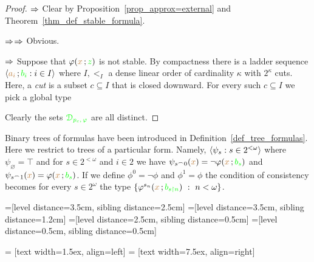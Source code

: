 \begin{proof}
 $\Rightarrow$ Clear by Proposition~\ref{prop_approx=external} and Theorem~\ref{thm_def_stable_formula}.
 
 $\Rightarrow$$\Rightarrow$ Obvious.
 
 $\Rightarrow$ Suppose that $\varphi({\color{brown} x}\,;{\color{green} z})$ is not stable.
 By compactness there is a ladder sequence  $\langle{\color{brown}a_i}\,;{\color{green} b_i} : i\in I\rangle$ where $I,<_I$ a dense linear order of cardinality $\kappa$ with $2^\kappa$ cuts.
 Here, a \textit{cut\/} is a subset $c\subseteq I$ that is closed downward.
 For every such $c\subseteq I$ we pick a global type
 
 \vspace*{-2ex}
 
 Clearly the sets ${\color{green}\EuScript D_{p_c,\,\varphi} }$ are all distinct.
\end{proof}

Binary trees of formulas have been introduced in Definition~\ref{def_tree_formulas}.
Here we restrict to trees of a particular form.
Namely, $\langle\psi_s:s\in 2^{<\omega}\rangle$  where $\psi_\varnothing=\top$ and for $s\in 2^{<\omega}$ and $i\in 2$ we have $\psi_{s^\frown 0}({\color{brown} x})=\neg\varphi({\color{brown} x}\,;{\color{green} b_s})$ and $\psi_{s^\frown 1}({\color{brown} x})=\varphi({\color{brown} x}\,;{\color{green} b_s})$.
If we define $\phi^0=\neg\phi$ and $\phi^1=\phi$ the condition of consistency becomes for every $s\in 2^\omega$ the type $\{\varphi^{s_n}({\color{brown} x}\,;{\color{green} b_{s\restriction n}})\ :\ n<\omega\}$.


=[level distance=3.5cm, sibling distance=2.5cm]
=[level distance=3.5cm, sibling distance=1.2cm]
=[level distance=2.5cm, sibling distance=0.5cm]
=[level distance=0.5cm, sibling distance=0.5cm]

 = [text width=1.5ex, align=left]
 = [text width=7.5ex, align=right]

\def\leaf{...}

